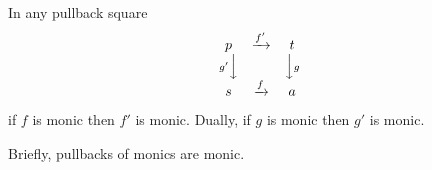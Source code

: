 In any pullback square
\[
\begin{array}{ccc}
p & \xrightarrow{f'} & t \\
{\scriptstyle g'}\Big\downarrow & & \Big\downarrow{\scriptstyle g} \\
s & \xrightarrow{f} & a
\end{array}
\]
if $f$ is monic then $f'$ is monic. Dually, if $g$ is monic then $g'$ is monic.

Briefly, pullbacks of monics are monic.
